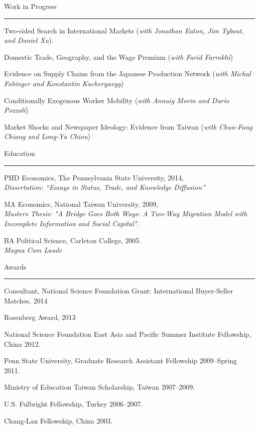 \documentclass[letterpaper]{article}
\renewenvironment{itemize}{
    \begin{list}{}{
            \setlength{\leftmargin}{1.5em}
            \setlength{\parskip}{0pt}
            \setlength{\parsep}{0pt}
        }
    }{
    \end{list}
}
\begin{document}
\vspace{4mm}
{\Large Work in Progress}
\vspace{1mm}
\hrule
\begin{itemize}
    \item Two-sided Search in International Markets (\emph{with Jonathan Eaton, Jim Tybout, and Daniel Xu}).
    \item Domestic Trade, Geography, and the Wage Premium (\emph{with Farid Farrokhi})
    \item Evidence on Supply Chains from the Japanese Production Network (\emph{with Michal Fabinger and Konstantin Kucheryavyy})
    \item Conditionally Exogenous Worker Mobility (\emph{with Annaig Morin and Dario Pozzoli})
    \item Market Shocks and Newspaper Ideology: Evidence from Taiwan (\emph{with Chun-Fang Chiang and Long-Yu Chiou})
\end{itemize}

\vspace{4mm}
{\Large Education}
\vspace{1mm}
\hrule

\begin{itemize}
    \item PHD Economics, The Pennsylvania State University, 2014,\\
    	\hspace*{1cm}\emph{Dissertation: ``Essays in Status, Trade, and Knowledge Diffusion''}

    \item MA Economics, National Taiwan University, 2009,\\
        \hspace*{1cm}\emph{Masters Thesis: "A Bridge Goes Both Ways: A Two-Way Migration Model with Incomplete Information \hspace*{1cm}and Social Capital".}

    \item BA Political Science, Carleton College, 2005.\\
        \hspace*{1cm}\emph{Magna Cum Laude}
\end{itemize}

\vspace{4mm}
{\Large Awards}
\vspace{1mm}
\hrule
\begin{itemize}
    \item Consultant, National Science Foundation Grant: International Buyer-Seller Matches, 2014
    \item Rosenberg Award, 2013
    \item National Science Foundation East Asia and Pacific Summer Institute Fellowship, China 2012.
    \item Penn State University, Graduate Research Assistant Fellowship 2009--Spring 2011.
    \item Ministry of Education Taiwan Scholarship, Taiwan 2007--2009.
    \item U.S. Fulbright Fellowship, Turkey 2006--2007.
    \item Chang-Lan Fellowship, China 2003.
\end{itemize}
\end{document}
